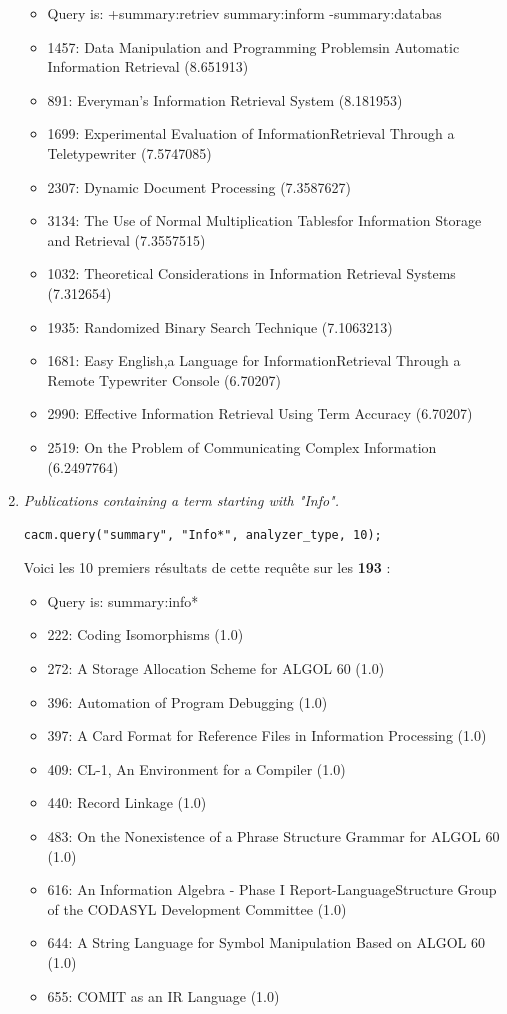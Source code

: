 \begin{enumerate}
\begin{itemize}
    \item Query is: +summary:retriev summary:inform -summary:databas
    \item 1457: Data Manipulation and Programming Problemsin Automatic Information Retrieval (8.651913)
    \item 891: Everyman's Information Retrieval System (8.181953)
    \item 1699: Experimental Evaluation of InformationRetrieval Through a Teletypewriter (7.5747085)
    \item 2307: Dynamic Document Processing (7.3587627)
    \item 3134: The Use of Normal Multiplication Tablesfor Information Storage and Retrieval (7.3557515)
    \item 1032: Theoretical Considerations in Information Retrieval Systems (7.312654)
    \item 1935: Randomized Binary Search Technique (7.1063213)
    \item 1681: Easy English,a Language for InformationRetrieval Through a Remote Typewriter Console (6.70207)
    \item 2990: Effective Information Retrieval Using Term Accuracy (6.70207)
    \item 2519: On the Problem of Communicating Complex Information (6.2497764)\\
\end{itemize}

\item \textit{Publications containing a term starting with "Info".}

\begin{lstlisting}
cacm.query("summary", "Info*", analyzer_type, 10);
\end{lstlisting}

Voici les 10 premiers résultats de cette requête sur les \textbf{193} :

\begin{itemize}
    \item Query is: summary:info*
    \item 222: Coding Isomorphisms (1.0)
    \item 272: A Storage Allocation Scheme for ALGOL 60 (1.0)
    \item 396: Automation of Program  Debugging (1.0)
    \item 397: A Card Format for Reference Files in Information Processing (1.0)
    \item 409: CL-1, An Environment for a Compiler (1.0)
    \item 440: Record Linkage (1.0)
    \item 483: On the Nonexistence of a Phrase Structure Grammar for ALGOL 60 (1.0)
    \item 616: An Information Algebra - Phase I Report-LanguageStructure Group of the CODASYL Development Committee (1.0)
    \item 644: A String Language for Symbol Manipulation Based on ALGOL 60 (1.0)
    \item 655: COMIT as an IR Language (1.0)\\
\end{itemize}


\end{enumerate}
